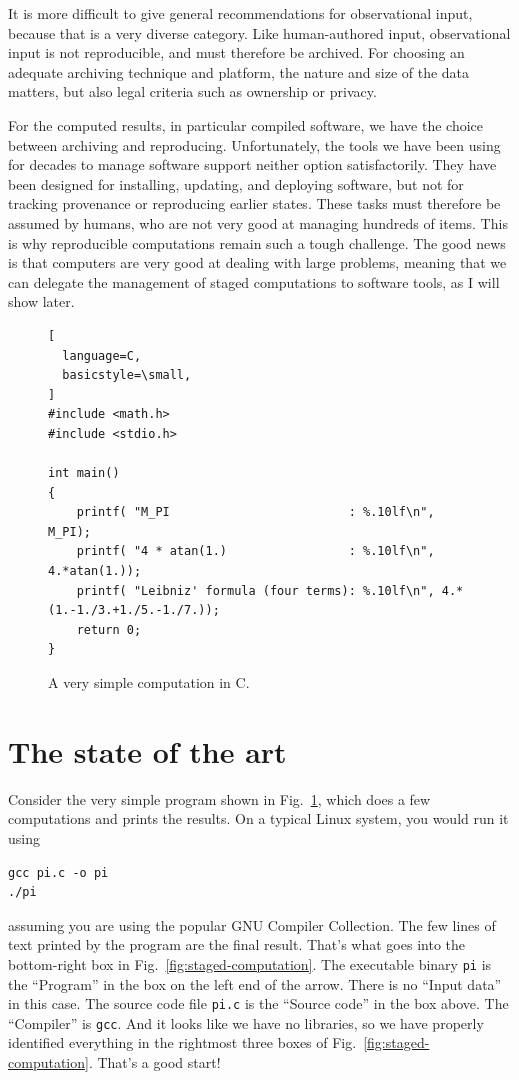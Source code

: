 \documentclass[10pt,journal,compsoc]{IEEEtran}
\begin{document}
It is more difficult to give general recommendations for observational input, because that is a very diverse category. Like human-authored input, observational input is not reproducible, and must therefore be archived. For choosing an adequate archiving technique and platform, the nature and size of the data matters, but also legal criteria such as ownership or privacy.

For the computed results, in particular compiled software, we have the choice between archiving and reproducing. Unfortunately, the tools we have been using for decades to manage software support neither option satisfactorily. They have been designed for installing, updating, and deploying software, but not for tracking provenance or reproducing earlier states. These tasks must therefore be assumed by humans, who are not very good at managing hundreds of items. This is why reproducible computations remain such a tough challenge. The good news is that computers are very good at dealing with large problems, meaning that we can delegate the management of staged computations to software tools, as I will show later.

\begin{figure}[!t]
\begin{lstlisting}[
  language=C,
  basicstyle=\small,
]
#include <math.h>
#include <stdio.h>

int main()
{
    printf( "M_PI                         : %.10lf\n", M_PI);
    printf( "4 * atan(1.)                 : %.10lf\n", 4.*atan(1.));
    printf( "Leibniz' formula (four terms): %.10lf\n", 4.*(1.-1./3.+1./5.-1./7.));
    return 0;
}
\end{lstlisting}
\caption{A very simple computation in C.}
\label{lst:pi}
\end{figure}

\section{The state of the art}

Consider the very simple program shown in Fig.~\ref{lst:pi}, which does a few computations and prints the results. On a typical Linux system, you would run it using
\begin{verbatim}
gcc pi.c -o pi
./pi
\end{verbatim}
assuming you are using the popular GNU Compiler Collection. The few lines of text printed by the program are the final result. That's what goes into the bottom-right box in Fig.~\ref{fig:staged-computation}. The executable binary \texttt{pi} is the ``Program'' in the box on the left end of the arrow. There is no ``Input data'' in this case. The source code file \texttt{pi.c} is the ``Source code'' in the box above. The ``Compiler'' is \texttt{gcc}. And it looks like we have no libraries, so we have properly identified everything in the rightmost three boxes of Fig.~\ref{fig:staged-computation}. That's a good start!
\end{document}
